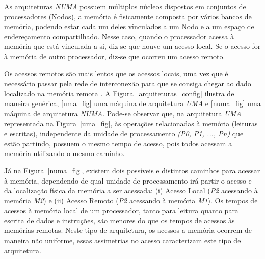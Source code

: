 \documentclass[ti]{texufpel}
\begin{document}
As arquiteturas \emph{NUMA} possuem múltiplos núcleos dispostos em conjuntos de processadores (Nodos), a memória é fisicamente composta por vários bancos de memória, podendo estar cada um deles vinculados a um Nodo e a um espaço de endereçamento compartilhado. Nesse caso, quando o processador acessa à memória que está vinculada a si, diz-se que houve um acesso local. Se o acesso for à memória de outro processador, diz-se que ocorreu um acesso remoto.

Os acessos remotos são mais lentos que os acessos locais, uma vez que é necessário passar pela rede de interconexão para que se consiga chegar ao dado localizado na memória remota \cite{rodolfo14}. A Figura~\ref{arquiteturas_config} ilustra de maneira genérica, \ref{uma_fig} uma máquina de arquitetura \emph{UMA} e \ref{numa_fig} uma máquina de arquitetura \emph{NUMA}. Pode-se observar que, na arquitetura \emph{UMA} representada na Figura~\ref{uma_fig}, às operações relacionadas à memória (leituras e escritas), independente da unidade de processamento \emph{(P0, P1, ..., Pn)} que estão partindo, possuem o mesmo tempo de acesso, pois todos acessam a memória utilizando o mesmo caminho.

Já na Figura~\ref{numa_fig}, existem dois possíveis e distintos caminhos para acessar à memória, dependendo de qual unidade de processamento irá partir o acesso e da localização física da memória a ser acessada: (i) Acesso Local (\emph{P2} acessando à memória \emph{M2}) e (ii) Acesso Remoto (\emph{P2} acessando à memória \emph{M1}). Os tempos de acessos à memória local de um processador, tanto para leitura quanto para escrita de dados e instruções, são menores do que os tempos de acessos às memórias remotas. Neste tipo de arquitetura, os acessos a memória ocorrem de maneira não uniforme, essas assimetrias no acesso caracterizam este tipo de arquitetura.
\end{document}
